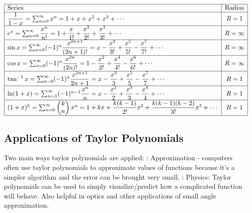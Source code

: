 \documentclass{article}
\begin{document}
    $$\begin{array}{ | l | c | }
        \hline
        \text{Series} & \text{Radius} \\
        \hline
        \dfrac{1}{1-x}=\sum^\infty_{n=0}x^n=1+x+x^2+x^3+\cdots & R=1 \\
        \hline
        e^x= \sum^\infty_{n=0}\dfrac{x^n}{n!}=1+\dfrac{x}{1!}+\dfrac{x^2}{2!}+\dfrac{x^3}{3!}+\cdots & R=\infty \\
        \hline
        \sin x=\sum^\infty_{n=0}(-1)^n\dfrac{x^{2n+1}}{(2n+1)!}=x-\dfrac{x^3}{3!}+\dfrac{x^5}{5!}-\dfrac{x^7}{7!}+\cdots  & R=\infty \\
        \hline
        \cos x=\sum^\infty_{n=0}(-1)^n\dfrac{x^{2n}}{(2n)!}=1-\dfrac{x^2}{2!}+\dfrac{x^4}{4!}-\dfrac{x^6}{6!}+\cdots  & R=\infty \\
        \hline
        \tan^{-1}x=\sum^\infty_{n=0}(-1)^n\dfrac{x^{2n+1}}{2n+1}=x-\dfrac{x^3}{3}+\dfrac{x^5}{5}-\dfrac{x^7}{7}+\cdots  & R=1 \\
        \hline
        \ln(1+x)=\sum^\infty_{n=1}(-1)^{n-1}\dfrac{x^n}{n}=x-\dfrac{x^2}{2}+\dfrac{x^3}{3}-\dfrac{x^4}{4}+\cdots  & R=1 \\ 
        \hline
        (1+x)^k=\sum^\infty_{n=0}\begin{pmatrix}k\\n\end{pmatrix}x^n=1+kx+\dfrac{k(k-1)}{2!}x^2+\dfrac{k(k-1)(k-2)}{3!}x^3+\cdots  & R=1 \\ 
        \hline     
    \end{array}$$
    \subsection{Applications of Taylor Polynomials}
    \begin{outline}
        \1 Two main ways taylor polynomials are applied: 
            : Approximation - computers often use taylor polynomials to approximate values of functions because it's a simpler algorithm and the error can be brought very small. 
            : Physics: Taylor polynomials can be used to simply visualize/predict how a complicated function will behave. Also helpful in optics and other applications of small angle approximation. 
    \end{outline}
\end{document}
